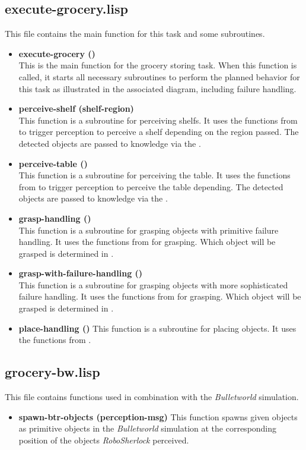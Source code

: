 \documentclass[main.tex]{subfiles}
\begin{document}
		\subsection{execute-grocery.lisp}
		This file contains the main function for this task and some subroutines.
		\begin{itemize}
			\item \textbf{execute-grocery ()} \\
			This is the main function for the grocery storing task. When this function is called, it starts all necessary subroutines to perform the planned behavior for this task as illustrated in the associated diagram, including failure handling.
			\item \textbf{perceive-shelf (shelf-region)} \\
			This function is a subroutine for perceiving shelfs. It uses the functions from  to trigger perception to perceive a shelf depending on the region passed. The detected objects are passed to knowledge via the .
			\item \textbf{perceive-table ()} \\
			This function is a subroutine for perceiving the table. It uses the functions from  to trigger perception to perceive the table depending. The detected objects are passed to knowledge via the .
			\item \textbf{grasp-handling ()} \\
			This function is a subroutine for grasping objects with primitive failure handling. It uses the functions from  for grasping. Which object will be grasped is determined in .
			\item \textbf{grasp-with-failure-handling ()} \\
			This function is a subroutine for grasping objects with more sophisticated failure handling. It uses the functions from  for grasping. Which object will be grasped is determined in .
			\item \textbf{place-handling ()}
			This function is a subroutine for placing objects. It uses the functions from .
		\end{itemize}
		
		\subsection{grocery-bw.lisp}
		This file contains functions used in combination with the \textit{Bulletworld} simulation.
		\begin{itemize}
			\item \textbf{spawn-btr-objects (perception-msg)}
			This function spawns given objects as primitive objects in the \textit{Bulletworld} simulation at the corresponding position of the objects \textit{RoboSherlock} perceived.  
		\end{itemize}
	  	
\end{document}
